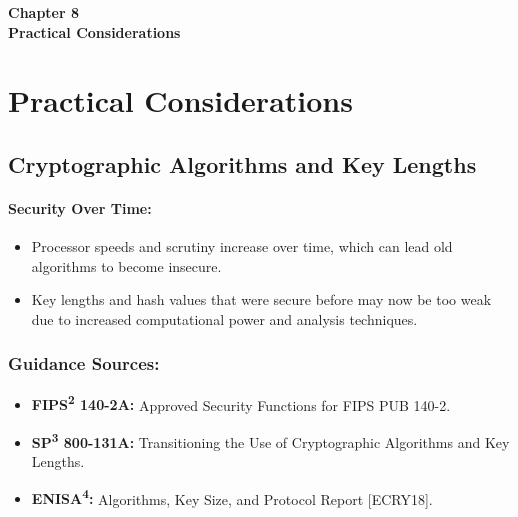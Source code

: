 \renewcommand{\footrulewidth}{0.5pt}


\clearpage
\thispagestyle{empty} 
\begin{center}
    \vspace*{\fill} 
    \Huge \textbf{Chapter 8} \\
    \Huge \textbf{Practical Considerations} 
    \vspace*{\fill}
\end{center}
\clearpage

\chapter{Practical Considerations}

\section{Cryptographic Algorithms and Key Lengths}

\subsubsection{Security Over Time:}
\begin{itemize}
    \item Processor speeds and scrutiny increase over time, which can lead old algorithms to become insecure.
    \item Key lengths and hash values that were secure before may now be too weak due to increased computational power and analysis techniques.
\end{itemize}

\subsection{Guidance Sources:}
\begin{itemize}
    \item \textbf{FIPS\textsuperscript{2} 140-2A:} Approved Security Functions for FIPS PUB 140-2.
    \item \textbf{SP\textsuperscript{3} 800-131A:} Transitioning the Use of Cryptographic Algorithms and Key Lengths.
    \item \textbf{ENISA\textsuperscript{4}:} Algorithms, Key Size, and Protocol Report [ECRY18].
\end{itemize}

